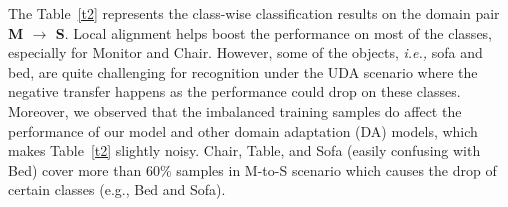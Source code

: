 \documentclass{article}
\begin{document}
The Table~\ref{t2} represents the class-wise classification results on the domain pair \textbf{M $\rightarrow$ S}. Local alignment helps boost the performance on most of the classes, especially for Monitor and Chair.  However, some of the objects, \textit{i.e.,} sofa and bed, are quite challenging for recognition under the UDA scenario where the negative transfer happens as the performance could drop on these classes. Moreover, we observed that the imbalanced training samples do affect the performance of our model and other domain adaptation (DA) models, which makes Table~\ref{t2} slightly noisy. Chair, Table, and Sofa (easily confusing with Bed) cover more than 60\% samples in M-to-S scenario which causes the drop of certain classes (e.g., Bed and Sofa). 

\begin{table*}[t]
\caption{Class-wise classification results (\%) on ModelNet to ShapeNet. }\label{t2}
\end{table*}
\end{document}
